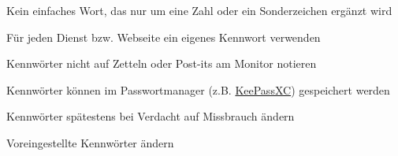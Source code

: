 \item Kein einfaches Wort, das nur um eine Zahl oder ein Sonderzeichen ergänzt wird
\item Für jeden Dienst bzw. Webseite ein eigenes Kennwort verwenden
\item Kennwörter nicht auf Zetteln oder Post-its am Monitor notieren
\item Kennwörter können im Passwortmanager (z.B. \href{https://keepassxc.org/}{KeePassXC}) gespeichert werden
\item Kennwörter spätestens bei Verdacht auf Missbrauch ändern
\item Voreingestellte Kennwörter ändern